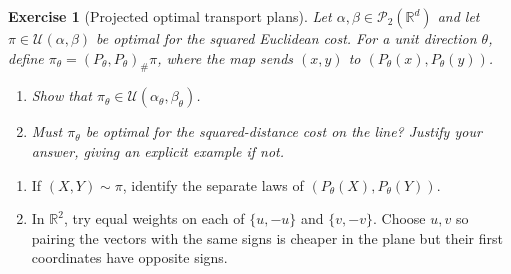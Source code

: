 \documentclass[11pt,a4paper]{article}
\theoremstyle{exostyle}
\newtheorem{exercise}{Exercise}
\newcommand{\R}{\mathbb{R}}
\newcommand{\push}{\#}
\newcommand{\PPtwo}{\mathcal P_2}
\newcommand{\Couplings}{\mathcal U}
\begin{document}
\begin{exercise}[Projected optimal transport plans]\label{ex-sliced-plans}
Let $\alpha,\beta\in\PPtwo(\R^d)$ and let
$\pi\in\Couplings(\alpha,\beta)$ be optimal for the squared Euclidean
cost. For a unit direction $\theta$, define
$\pi_\theta=(P_\theta,P_\theta)_\push\pi$, where the map sends
$(x,y)$ to $(P_\theta(x),P_\theta(y))$.
\begin{enumerate}[label=(\alph*)]
\item Show that $\pi_\theta\in\Couplings(\alpha_\theta,\beta_\theta)$.
\item Must $\pi_\theta$ be optimal for the squared-distance cost on
  the line? Justify your answer, giving an explicit example if not.
\end{enumerate}
\end{exercise}
\begin{hints}
\begin{enumerate}[label=(\alph*)]
\item If $(X,Y)\sim\pi$, identify the separate laws of
  $(P_\theta(X),P_\theta(Y))$.
\item In $\R^2$, try equal weights on each of $\{u,-u\}$ and
  $\{v,-v\}$. Choose $u,v$ so pairing the vectors with the same signs
  is cheaper in the plane but their first coordinates have opposite signs.
\end{enumerate}
\end{hints}
\end{document}
